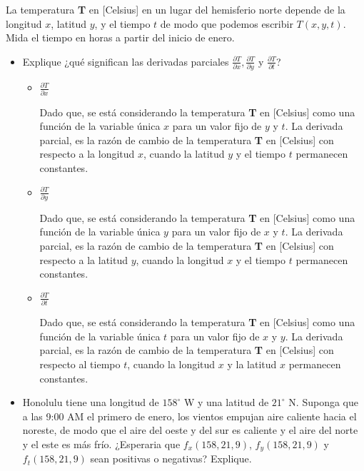 \documentclass[12pt]{article}
\begin{document}
\section{}

La temperatura \textbf{T} en [Celsius] en un lugar del hemisferio norte depende de la longitud $x$, latitud $y$, y el tiempo $t$ de modo que podemos escribir $T(x, y, t)$. Mida el tiempo en horas a partir del inicio de enero.

\begin{itemize}[format=\textbf]

\item Explique ¿qué significan las derivadas parciales $\frac{\partial T}{\partial x}, \frac{\partial T}{\partial y}$ y $\frac{\partial T}{\partial t}$?

  \begin{itemize}
    
  \item $\frac{\partial T}{\partial x}$

    Dado que, se está considerando la temperatura \textbf{T} en [Celsius] como una función de la variable única $x$ para un valor fijo de $y$ y $t$.
    La derivada parcial, es la razón de cambio de la temperatura \textbf{T} en [Celsius] con respecto a la longitud $x$, cuando la latitud $y$ y el tiempo $t$ permanecen constantes.
    
  \item $\frac{\partial T}{\partial y}$

    Dado que, se está considerando la temperatura \textbf{T} en [Celsius] como una función de la variable única $y$ para un valor fijo de $x$ y $t$.
    La derivada parcial, es la razón de cambio de la temperatura \textbf{T} en [Celsius] con respecto a la latitud $y$, cuando la longitud $x$ y el tiempo $t$ permanecen constantes.
    
  \item $\frac{\partial T}{\partial t}$

    Dado que, se está considerando la temperatura \textbf{T} en [Celsius] como una función de la variable única $t$ para un valor fijo de $x$ y $y$.
    La derivada parcial, es la razón de cambio de la temperatura \textbf{T} en [Celsius] con respecto al tiempo $t$, cuando la longitud $x$ y la latitud $x$ permanecen constantes.
    
  \end{itemize}

\item Honolulu tiene una longitud de $158^{\circ}$ W y una latitud de $21^{\circ}$ N. Suponga que a las 9:00 AM el primero de enero, los vientos empujan aire caliente hacia el noreste, de modo que el aire del oeste y del sur es caliente y el aire del norte y el este es más frío. ¿Esperaria que $f_x(158, 21, 9)$, $f_y(158, 21, 9)$ y $f_t(158, 21, 9)$ sean positivas o
negativas? Explique.

\end{itemize}
\end{document}
